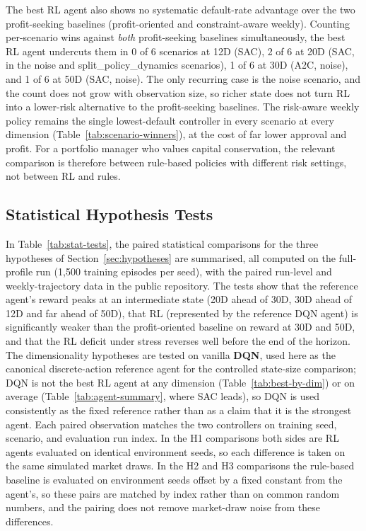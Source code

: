 \documentclass[preprint,review,authoryear,12pt]{elsarticle}
\begin{document}
The best RL agent also shows no systematic default-rate advantage over the two
profit-seeking baselines (profit-oriented and constraint-aware weekly). Counting
per-scenario wins against \emph{both} profit-seeking baselines simultaneously, the best
RL agent undercuts them in 0 of 6 scenarios at 12D (SAC), 2 of 6 at 20D (SAC, in the
noise and split\_policy\_dynamics scenarios), 1 of 6 at 30D (A2C, noise), and 1 of 6 at
50D (SAC, noise). The only recurring case is the noise scenario, and the count does not
grow with observation size, so richer state does not turn RL into a lower-risk
alternative to the profit-seeking baselines. The risk-aware weekly policy remains the
single lowest-default controller in every scenario at every dimension
(Table~\ref{tab:scenario-winners}), at the cost of far lower approval and profit. For a
portfolio manager who values capital conservation, the relevant comparison is therefore
between rule-based policies with different risk settings, not between RL and rules.

\subsection{Statistical Hypothesis Tests}
\label{sec:stat-tests}

In Table~\ref{tab:stat-tests}, the paired statistical comparisons for the three
hypotheses of Section~\ref{sec:hypotheses} are summarised, all computed on the
full-profile run (1{,}500 training episodes per seed), with the paired run-level and
weekly-trajectory data in the public repository. The tests show that the reference
agent's reward peaks at an intermediate state (20D ahead of 30D, 30D ahead of 12D and far
ahead of 50D), that RL (represented by the reference DQN agent) is significantly weaker
than the profit-oriented baseline on reward at 30D and 50D, and that the RL deficit under
stress reverses well before the end of the horizon. The dimensionality hypotheses are
tested on vanilla \textbf{DQN}, used here as the canonical discrete-action reference agent
for the controlled state-size comparison; DQN is not the best RL agent at any dimension
(Table~\ref{tab:best-by-dim}) or on average (Table~\ref{tab:agent-summary}, where SAC
leads), so DQN is used consistently as the fixed reference rather than as a claim that it
is the strongest agent. Each paired observation matches the two controllers on training
seed, scenario, and evaluation run index. In the H1 comparisons both sides are RL agents
evaluated on identical environment seeds, so each difference is taken on the same
simulated market draws. In the H2 and H3 comparisons the rule-based baseline is evaluated
on environment seeds offset by a fixed constant from the agent's, so these pairs are
matched by index rather than on common random numbers, and the pairing does not remove
market-draw noise from these differences.
\end{document}
